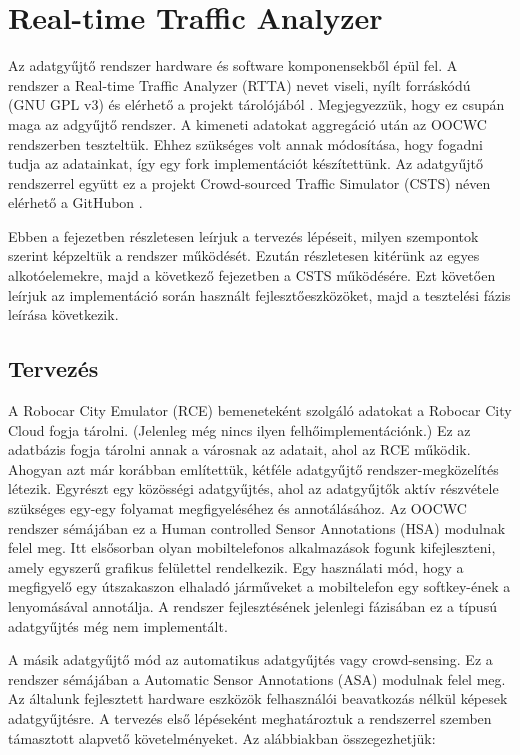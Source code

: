 \documentclass[a4paper,12pt]{report}
\begin{document}
\chapter{Real-time Traffic Analyzer}
\label{rttachapter}

Az adatgyűjtő rendszer hardware és software komponensekből épül fel. A rendszer a Real-time Traffic Analyzer (RTTA) nevet viseli, nyílt forráskódú (GNU GPL v3) és elérhető a projekt tárolójából \cite{rtta}. Megjegyezzük, hogy ez csupán maga az adgyűjtő rendszer. A kimeneti adatokat aggregáció után az OOCWC rendszerben teszteltük. Ehhez szükséges volt annak módosítása, hogy fogadni tudja az adatainkat, így egy fork implementációt készítettünk. Az adatgyűjtő rendszerrel együtt ez a projekt Crowd-sourced Traffic Simulator (CSTS) néven elérhető a GitHubon \cite{csts}. 

Ebben a fejezetben részletesen leírjuk a tervezés lépéseit, milyen szempontok szerint képzeltük a rendszer működését. Ezután részletesen kitérünk az egyes alkotóelemekre, majd a következő fejezetben a CSTS működésére. Ezt követően leírjuk az implementáció során használt fejlesztőeszközöket, majd a tesztelési fázis leírása következik.

\section{Tervezés}
\label{tervezes}

A Robocar City Emulator (RCE) bemeneteként szolgáló adatokat a Robocar City Cloud fogja tárolni. (Jelenleg még nincs ilyen felhőimplementációnk.) Ez az adatbázis fogja tárolni annak a városnak az adatait, ahol az RCE működik. Ahogyan azt már korábban említettük, kétféle adatgyűjtő rendszer-megközelítés létezik. Egyrészt egy közösségi adatgyűjtés, ahol az adatgyűjtők aktív részvétele szükséges egy-egy folyamat megfigyeléséhez és annotálásához. Az OOCWC rendszer sémájában ez a Human controlled Sensor Annotations (HSA) modulnak felel meg. Itt elsősorban olyan mobiltelefonos alkalmazások fogunk kifejleszteni, amely egyszerű grafikus felülettel rendelkezik. Egy használati mód, hogy a megfigyelő egy útszakaszon elhaladó járműveket a mobiltelefon egy softkey-ének a lenyomásával annotálja. A rendszer fejlesztésének jelenlegi fázisában ez a típusú adatgyűjtés még nem implementált.

A másik adatgyűjtő mód az automatikus adatgyűjtés vagy crowd-sensing. Ez a rendszer sémájában a Automatic Sensor Annotations (ASA) modulnak felel meg. Az általunk fejlesztett hardware eszközök felhasználói beavatkozás nélkül képesek adatgyűjtésre. A tervezés első lépéseként meghatároztuk a rendszerrel szemben támasztott alapvető követelményeket. Az alábbiakban összegezhetjük:
\end{document}
